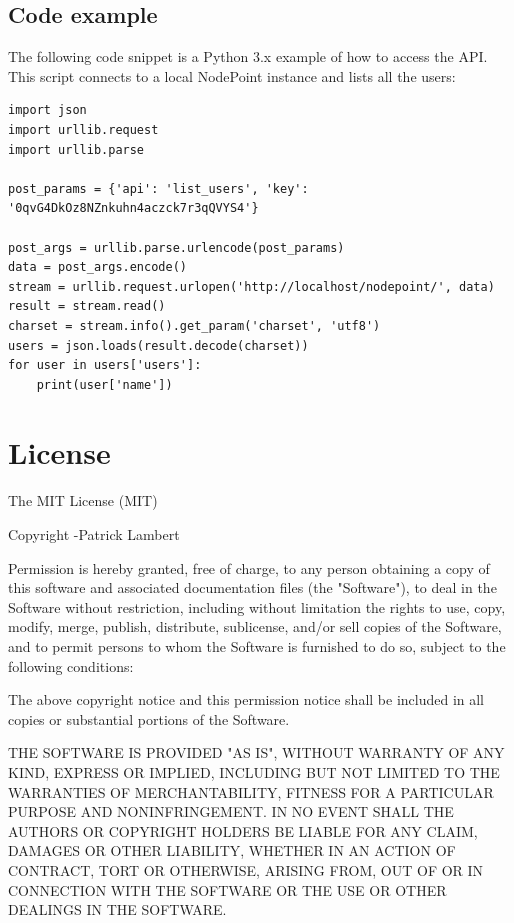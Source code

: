 \documentclass[11pt]{article}
\begin{document}
\subsection{Code example}
The following code snippet is a Python 3.x example of how to access the API. This script connects to a local NodePoint instance and lists all the users:

\begin{lstlisting}
import json
import urllib.request
import urllib.parse

post_params = {'api': 'list_users', 'key': '0qvG4DkOz8NZnkuhn4aczck7r3qQVYS4'}

post_args = urllib.parse.urlencode(post_params)
data = post_args.encode()
stream = urllib.request.urlopen('http://localhost/nodepoint/', data)
result = stream.read()
charset = stream.info().get_param('charset', 'utf8')
users = json.loads(result.decode(charset))
for user in users['users']:
    print(user['name'])
\end{lstlisting}

\clearpage
\section{License}
The MIT License (MIT)

Copyright \textcopyright {}-\the\year \thinspace Patrick Lambert

Permission is hereby granted, free of charge, to any person obtaining a copy
of this software and associated documentation files (the "Software"), to deal
in the Software without restriction, including without limitation the rights
to use, copy, modify, merge, publish, distribute, sublicense, and/or sell
copies of the Software, and to permit persons to whom the Software is
furnished to do so, subject to the following conditions:

The above copyright notice and this permission notice shall be included in
all copies or substantial portions of the Software.

THE SOFTWARE IS PROVIDED "AS IS", WITHOUT WARRANTY OF ANY KIND, EXPRESS OR
IMPLIED, INCLUDING BUT NOT LIMITED TO THE WARRANTIES OF MERCHANTABILITY,
FITNESS FOR A PARTICULAR PURPOSE AND NONINFRINGEMENT. IN NO EVENT SHALL THE
AUTHORS OR COPYRIGHT HOLDERS BE LIABLE FOR ANY CLAIM, DAMAGES OR OTHER
LIABILITY, WHETHER IN AN ACTION OF CONTRACT, TORT OR OTHERWISE, ARISING FROM,
OUT OF OR IN CONNECTION WITH THE SOFTWARE OR THE USE OR OTHER DEALINGS IN
THE SOFTWARE.
\end{document}
